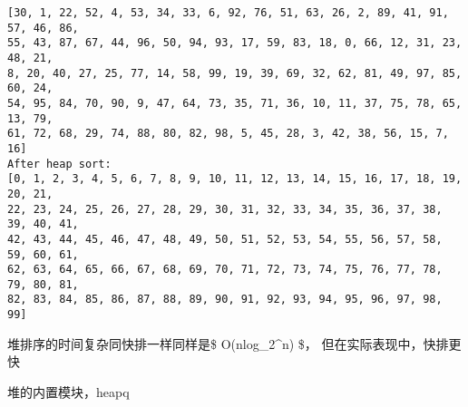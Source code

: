 \documentclass[11pt]{article}
\begin{document}
    \begin{Verbatim}[commandchars=\\\{\}]
[30, 1, 22, 52, 4, 53, 34, 33, 6, 92, 76, 51, 63, 26, 2, 89, 41, 91, 57, 46, 86,
55, 43, 87, 67, 44, 96, 50, 94, 93, 17, 59, 83, 18, 0, 66, 12, 31, 23, 48, 21,
8, 20, 40, 27, 25, 77, 14, 58, 99, 19, 39, 69, 32, 62, 81, 49, 97, 85, 60, 24,
54, 95, 84, 70, 90, 9, 47, 64, 73, 35, 71, 36, 10, 11, 37, 75, 78, 65, 13, 79,
61, 72, 68, 29, 74, 88, 80, 82, 98, 5, 45, 28, 3, 42, 38, 56, 15, 7, 16]
After heap sort:
[0, 1, 2, 3, 4, 5, 6, 7, 8, 9, 10, 11, 12, 13, 14, 15, 16, 17, 18, 19, 20, 21,
22, 23, 24, 25, 26, 27, 28, 29, 30, 31, 32, 33, 34, 35, 36, 37, 38, 39, 40, 41,
42, 43, 44, 45, 46, 47, 48, 49, 50, 51, 52, 53, 54, 55, 56, 57, 58, 59, 60, 61,
62, 63, 64, 65, 66, 67, 68, 69, 70, 71, 72, 73, 74, 75, 76, 77, 78, 79, 80, 81,
82, 83, 84, 85, 86, 87, 88, 89, 90, 91, 92, 93, 94, 95, 96, 97, 98, 99]
    \end{Verbatim}

    堆排序的时间复杂同快排一样同样是\$ O(nlog\_2\^{}n) \$，
但在实际表现中，快排更快

    堆的内置模块，heapq
\end{document}
